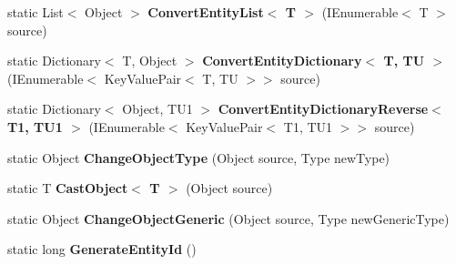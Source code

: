 \begin{DoxyCompactItemize}
\item 
\hypertarget{class_s_e_mod_a_p_i_internal_1_1_a_p_i_1_1_utility_1_1_utility_functions_a4b363f8fce17055305ed9b1f10f812cd}{}static List$<$ Object $>$ {\bfseries Convert\+Entity\+List$<$ T $>$} (I\+Enumerable$<$ T $>$ source)\label{class_s_e_mod_a_p_i_internal_1_1_a_p_i_1_1_utility_1_1_utility_functions_a4b363f8fce17055305ed9b1f10f812cd}

\item 
\hypertarget{class_s_e_mod_a_p_i_internal_1_1_a_p_i_1_1_utility_1_1_utility_functions_a097ad653b33f1fd112c3e6e86446eef9}{}static Dictionary$<$ T, Object $>$ {\bfseries Convert\+Entity\+Dictionary$<$ T, T\+U $>$} (I\+Enumerable$<$ Key\+Value\+Pair$<$ T, T\+U $>$$>$ source)\label{class_s_e_mod_a_p_i_internal_1_1_a_p_i_1_1_utility_1_1_utility_functions_a097ad653b33f1fd112c3e6e86446eef9}

\item 
\hypertarget{class_s_e_mod_a_p_i_internal_1_1_a_p_i_1_1_utility_1_1_utility_functions_a20c27b8c98907948fd56d6b76b8b5e43}{}static Dictionary$<$ Object, T\+U1 $>$ {\bfseries Convert\+Entity\+Dictionary\+Reverse$<$ T1, T\+U1 $>$} (I\+Enumerable$<$ Key\+Value\+Pair$<$ T1, T\+U1 $>$$>$ source)\label{class_s_e_mod_a_p_i_internal_1_1_a_p_i_1_1_utility_1_1_utility_functions_a20c27b8c98907948fd56d6b76b8b5e43}

\item 
\hypertarget{class_s_e_mod_a_p_i_internal_1_1_a_p_i_1_1_utility_1_1_utility_functions_a565de7245ab9859d418ab80a9d08ed61}{}static Object {\bfseries Change\+Object\+Type} (Object source, Type new\+Type)\label{class_s_e_mod_a_p_i_internal_1_1_a_p_i_1_1_utility_1_1_utility_functions_a565de7245ab9859d418ab80a9d08ed61}

\item 
\hypertarget{class_s_e_mod_a_p_i_internal_1_1_a_p_i_1_1_utility_1_1_utility_functions_a7b67ab30279a7f95d1a96860f79e1b5a}{}static T {\bfseries Cast\+Object$<$ T $>$} (Object source)\label{class_s_e_mod_a_p_i_internal_1_1_a_p_i_1_1_utility_1_1_utility_functions_a7b67ab30279a7f95d1a96860f79e1b5a}

\item 
\hypertarget{class_s_e_mod_a_p_i_internal_1_1_a_p_i_1_1_utility_1_1_utility_functions_abfeffbef58abdb47580d7e47f232c97e}{}static Object {\bfseries Change\+Object\+Generic} (Object source, Type new\+Generic\+Type)\label{class_s_e_mod_a_p_i_internal_1_1_a_p_i_1_1_utility_1_1_utility_functions_abfeffbef58abdb47580d7e47f232c97e}

\item 
\hypertarget{class_s_e_mod_a_p_i_internal_1_1_a_p_i_1_1_utility_1_1_utility_functions_a4d099da87cd97b3a81ee9e9e3c32917a}{}static long {\bfseries Generate\+Entity\+Id} ()\label{class_s_e_mod_a_p_i_internal_1_1_a_p_i_1_1_utility_1_1_utility_functions_a4d099da87cd97b3a81ee9e9e3c32917a}


\end{DoxyCompactItemize}
